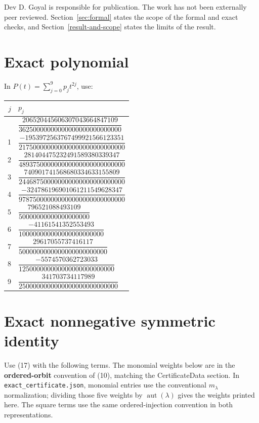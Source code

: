 \documentclass[11pt]{article}
\begin{document}
Dev D. Goyal is responsible for publication. The work has not been externally peer reviewed. Section~\ref{sec:formal} states the scope of the formal and exact checks, and Section~\ref{result-and-scope} states the limits of the result.

\appendix

\section{Exact polynomial}\label{appendix-a.-exact-polynomial}

In \(P(t)=\sum_{j=0}^9p_jt^{2j}\), use:

\begingroup
\small
\renewcommand{\arraystretch}{1.7}
\begin{longtable}{@{}r@{\qquad}l@{}}
\toprule
$j$ & $p_j$ \\
\midrule
\endhead
\bottomrule
\endlastfoot
0 & \(\dfrac{206520445606307043664847109}{36250000000000000000000000000}\) \\[6pt]
1 & \(\dfrac{-1953972563767499921566123351}{217500000000000000000000000000}\) \\[6pt]
2 & \(\dfrac{281404475232491589380339347}{489375000000000000000000000000}\) \\[6pt]
3 & \(\dfrac{740901741568680334633155809}{244687500000000000000000000000}\) \\[6pt]
4 & \(\dfrac{-324786196901061211549628347}{978750000000000000000000000000}\) \\[6pt]
5 & \(\dfrac{796521088493109}{50000000000000000000}\) \\[6pt]
6 & \(\dfrac{-41161541352553493}{100000000000000000000000}\) \\[6pt]
7 & \(\dfrac{29617055737416117}{5000000000000000000000000}\) \\[6pt]
8 & \(\dfrac{-5574570362723033}{125000000000000000000000000}\) \\[6pt]
9 & \(\dfrac{341703734117989}{2500000000000000000000000000}\) \\[6pt]
\end{longtable}
\endgroup

\clearpage

\section{Exact nonnegative symmetric identity}\label{appendix-b.-exact-nonnegative-symmetric-identity}

Use (17) with the following terms. The monomial weights below are in the
\textbf{ordered-orbit} convention of (10), matching the CertificateData
section. In \texttt{exact\_certificate.json}, monomial entries use the
conventional \(m_\lambda\) normalization; dividing those five weights by
\(\operatorname{aut}(\lambda)\) gives the weights printed here. The
square terms use the same ordered-injection convention in both
representations.
\end{document}
